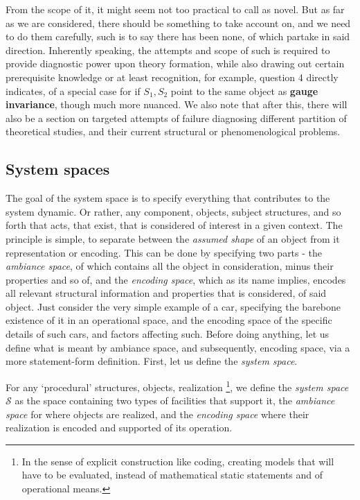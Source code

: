 From the scope of it, it might seem not too practical to call as novel. But as far as we are considered, there should be something to take account on, and we need to do them carefully, such is to say there has been none, of which partake in said direction. Inherently speaking, the attempts and scope of such is required to provide diagnostic power upon theory formation, while also drawing out certain prerequisite knowledge or at least recognition, for example, question 4 directly indicates, of a special case for if $S_1, S_2$ point to the same object as \textbf{gauge invariance}, though much more nuanced. We also note that after this, there will also be a section on targeted attempts of failure diagnosing different partition of theoretical studies, and their current structural or phenomenological problems. 

\subsection{System spaces}
The goal of the system space is to specify everything that contributes to the system dynamic. Or rather, any component, objects, subject structures, and so forth that acts, that exist, that is considered of interest in a given context. The principle is simple, to separate between the \textit{assumed shape} of an object from it representation or encoding. This can be done by specifying two parts - the \textit{ambiance space}, of which contains all the object in consideration, minus their properties and so of, and the \textit{encoding space}, which as its name implies, encodes all relevant structural information and properties that is considered, of said object. Just consider the very simple example of a car, specifying the barebone existence of it in an operational space, and the encoding space of the specific details of such cars, and factors affecting such. Before doing anything, let us define what is meant by ambiance space, and subsequently, encoding space, via a more statement-form definition. First, let us define the \textit{system space}. 
\begin{definition}
  For any `procedural' structures, objects, realization \footnote{In the sense of explicit construction like coding, creating models that will have to be evaluated, instead of mathematical static statements and of operational means.}, we define the \textit{system space} $\mathcal{S}$ as the space containing two types of facilities that support it, the \textit{ambiance space} for where objects are realized, and the \textit{encoding space} where their realization is encoded and supported of its operation. 
\end{definition}
